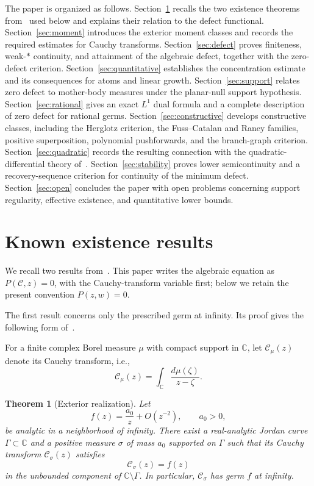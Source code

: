 \documentclass[10pt,a4paper]{amsart}
\newtheorem{theorem}{Theorem}[section]
\newcommand{\bC}{\mathbb C}
\newcommand{\Cauchy}{\mathcal C}
\begin{document}
The paper is organized as follows.  Section~\ref{sec:BoSh-background}
recalls the two existence theorems from~\cite{BoSh} used below and explains
their relation to the defect functional.  Section~\ref{sec:moment} introduces
the exterior moment classes and records the required estimates for Cauchy
transforms.  Section~\ref{sec:defect} proves finiteness, weak-$*$ continuity,
and attainment of the algebraic defect, together with the zero-defect
criterion.  Section~\ref{sec:quantitative} establishes the concentration
estimate and its consequences for atoms and linear growth.  Section~\ref{sec:support} relates zero defect to mother-body measures under
the planar-null support hypothesis.  Section~\ref{sec:rational} gives an exact $L^1$ dual formula and a
complete description of zero defect for rational germs.  Section~\ref{sec:constructive}
develops constructive classes, including the Herglotz criterion, the
Fuss--Catalan and Raney families, positive superposition, polynomial
pushforwards, and the branch-graph criterion.  Section~\ref{sec:quadratic}
records the resulting connection with the quadratic-differential theory
of~\cite{BoSh}.  Section~\ref{sec:stability} proves lower semicontinuity and a
recovery-sequence criterion for continuity of the minimum defect.  Section~\ref{sec:open} concludes the paper with open problems concerning
support regularity, effective existence, and quantitative lower bounds.

\section{Known existence results}\label{sec:BoSh-background}

We recall two results from~\cite{BoSh}.  This paper writes the algebraic equation
as $P(\Cauchy,z)=0$, with the Cauchy-transform variable first; below we retain the
present convention $P(z,w)=0$.

The first result concerns only the prescribed germ at infinity.  Its proof gives
the following form of~\cite[Theorem~1]{BoSh}. 

For a finite complex Borel measure
$\mu$ with compact support in $\bC$, let $\Cauchy_\mu(z)$ denote its Cauchy transform, i.e., 
\[
 \Cauchy_\mu(z)=\int_{\bC}\frac{d\mu(\zeta)}{z-\zeta}.
\]


\begin{theorem}[Exterior realization]
\label{thm:BoSh-exterior}
Let
\[
 f(z)=\frac{a_0}{z}+O(z^{-2}),\qquad a_0>0,
\]
be analytic in a neighborhood of infinity.  There exist a real-analytic Jordan
curve $\Gamma\subset\bC$ and a positive measure $\sigma$ of mass $a_0$ supported
on $\Gamma$ such that its Cauchy transform $ \Cauchy_\sigma(z)$ satisfies 
\[
 \Cauchy_\sigma(z)=f(z)
\]
in the unbounded component of $\bC\setminus\Gamma$.  In particular,
$\Cauchy_\sigma$ has germ $f$ at infinity.
\end{theorem}
\end{document}

